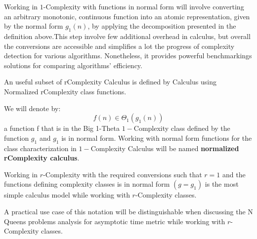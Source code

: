 \begin{remark}
    Working in $1$-Complexity with functions in normal form will involve converting an arbitrary monotonic, continuous function into an atomic representation, given by the normal form $g_{1}(n)$, by applying the decomposition presented in the definition above.This step involve few additional overhead in calculus, but overall the conversions are accessible and simplifies a lot the progress of complexity detection for various algorithms. Nonetheless, it provides powerful benchmarkings solutions for comparing algorithms' efficiency.
\end{remark}

An useful subset of rComplexity Calculus is defined by Calculus using Normalized rComplexity class functions.
\begin{definition}
    We will denote by:
    \[ f(n) \in \Theta_{1}(g_{1}(n)) \]
    a function f that is in the Big 1-Theta $1-$Complexity class defined by the function $g_{1}$ and $g_{1}$ is in normal form. Working with normal form functions for the class characterization in $1-$Complexity Calculus will be named \textbf{normalized rComplexity calculus}.
\end{definition}

\begin{remark}
    Working in $r$-Complexity with the required conversions such that $r = 1$ and the functions defining complexity classes is in normal form $(g = g_{1})$ is the most simple
    calculus model while working with $r$-Complexity classes.
\end{remark}


\begin{remark}
    A practical use case of this notation will be distinguishable when discussing the N Queens problems analysis for asymptotic time metric while working with $r$-Complexity classes.
\end{remark}